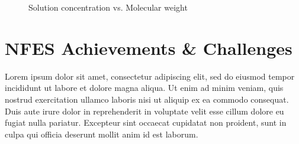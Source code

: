 \documentclass[5p,,preprint,12pt,twocolumn]{elsarticle}
\makeatletter
\def\fixFloatSize#1{}%
\makeatother
\begin{document}
\bgroup
\fixFloatSize{images/fbd73f28-2c70-4a0a-be0b-f58ca8eab694-uweightconcentrationplot.png}
\begin{figure}[!htbp]
\centering \makeatletter{}
\makeatother 
\caption{{Solution concentration vs. Molecular weight}}
\label{f-ab38f7e015f7}
\end{figure}
\egroup

    
\section{NFES Achievements \& Challenges}
Lorem ipsum dolor sit amet, consectetur adipiscing elit, sed do eiusmod tempor incididunt ut labore et dolore magna aliqua. Ut enim ad minim veniam, quis nostrud exercitation ullamco laboris nisi ut aliquip ex ea commodo consequat. Duis aute irure dolor in reprehenderit in voluptate velit esse cillum dolore eu fugiat nulla pariatur. Excepteur sint occaecat cupidatat non proident, sunt in culpa qui officia deserunt mollit anim id est laborum.
    






\end{document}
